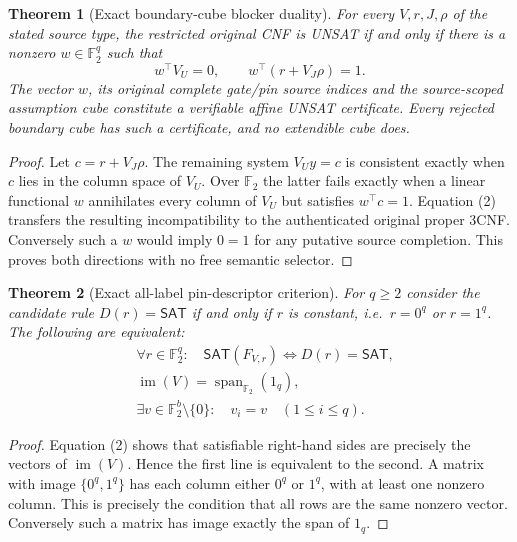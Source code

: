 \documentclass[11pt]{article}
\newtheorem{theorem}{Theorem}
\newcommand{\SAT}{\mathsf{SAT}}
\begin{document}
\begin{theorem}[Exact boundary-cube blocker duality]\label{thm:dual}
For every $V,r,J,\rho$ of the stated source type, the restricted original CNF is UNSAT if and only if there is a nonzero $w\in\mathbb F_2^q$ such that
\[
w^\top V_U=0,\qquad w^\top(r+V_J\rho)=1. \tag{4}
\]
The vector $w$, its original complete gate/pin source indices and the source-scoped assumption cube constitute a verifiable affine UNSAT certificate. Every rejected boundary cube has such a certificate, and no extendible cube does.
\end{theorem}
\begin{proof}
Let $c=r+V_J\rho$. The remaining system $V_U y=c$ is consistent exactly when $c$ lies in the column space of $V_U$. Over $\mathbb F_2$ the latter fails exactly when a linear functional $w$ annihilates every column of $V_U$ but satisfies $w^\top c=1$. Equation (2) transfers the resulting incompatibility to the authenticated original proper 3CNF. Conversely such a $w$ would imply $0=1$ for any putative source completion. This proves both directions with no free semantic selector.
\end{proof}

\begin{theorem}[Exact all-label pin-descriptor criterion]\label{thm:descriptor}
For $q\ge2$ consider the candidate rule $D(r)=\SAT$ if and only if $r$ is constant, i.e.\ $r=0^q$ or $r=1^q$. The following are equivalent:
\[
\begin{split}
&\forall r\in\mathbb F_2^q:\quad \SAT(F_{V,r})\iff D(r)=\SAT,\\
&\operatorname{im}(V)=\operatorname{span}_{\mathbb F_2}(1_q),\\
&\exists v\in\mathbb F_2^b\setminus\{0\}:\quad v_i=v\quad(1\le i\le q). \tag{5}
\end{split}
\]
\end{theorem}
\begin{proof}
Equation (2) shows that satisfiable right-hand sides are precisely the vectors of $\operatorname{im}(V)$. Hence the first line is equivalent to the second. A matrix with image $\{0^q,1^q\}$ has each column either $0^q$ or $1^q$, with at least one nonzero column. This is precisely the condition that all rows are the same nonzero vector. Conversely such a matrix has image exactly the span of $1_q$.
\end{proof}
\end{document}

